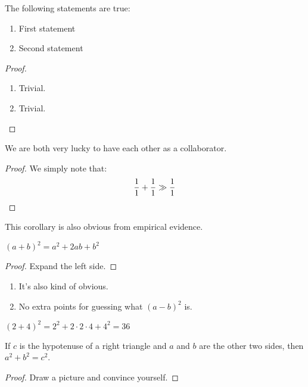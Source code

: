 \begin{theorem}
The following statements are true:
\begin{enumerate}
    \item First statement
    \item Second statement
\end{enumerate}
\end{theorem}
\begin{proof}%
\begin{enumerate}
    \item Trivial.
    \item Trivial.\qedhere %
\end{enumerate}
\end{proof}

\begin{corollary}
We are both very lucky to have each other as a collaborator.
\end{corollary}
\begin{proof}
We simply note that:
\begin{equation*}
    \frac{1}{1}+\frac{1}{1}\gg\frac{1}{1} \qedhere
\end{equation*}
\end{proof}
\begin{remark}
This corollary is also obvious from empirical evidence.
\end{remark}

\begin{lemma}
$(a+b)^2=a^2+2ab+b^2$
\end{lemma}
\begin{proof}
Expand the left side.
\end{proof}
\begin{remarks}\leavevmode
\begin{enumerate}
    \item It's also kind of obvious.
    \item No extra points for guessing what $(a-b)^2$ is.
\end{enumerate}
\end{remarks}

\begin{example}
$(2+4)^2=2^2+2\cdot 2\cdot 4+4^2=36$
\end{example}

\begin{theorem}\label{pythagoras}
If $c$ is the hypotenuse of a right triangle and $a$ and $b$ are the other two sides, then $a^2+b^2=c^2$.
\end{theorem}
\begin{proof}
Draw a picture and convince yourself.
\end{proof}

